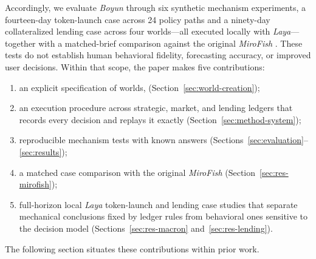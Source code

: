 Accordingly, we evaluate \textit{Boyun} through six synthetic mechanism
experiments, a fourteen-day  token-launch case across
24 policy paths and a ninety-day  collateralized lending
case across four worlds---all executed locally with \textit{Laya}---together
with a matched-brief comparison against the original \textit{MiroFish} . These tests do not establish human
behavioral fidelity, forecasting accuracy, or improved user decisions. Within
that scope, the paper makes five contributions:
\begin{enumerate}\setlength{\itemsep}{1pt}
\item an explicit specification of worlds, 
(Section~\ref{sec:world-creation});
\item an execution procedure across strategic, market, and lending ledgers that
records every  decision and replays it exactly
(Section~\ref{sec:method-system});
\item reproducible mechanism tests with known answers
(Sections~\ref{sec:evaluation}--\ref{sec:results});
\item a matched case comparison with the original \textit{MiroFish}
(Section~\ref{sec:res-mirofish});
\item full-horizon local \textit{Laya} token-launch and lending case studies
that
separate mechanical conclusions fixed by ledger rules from behavioral ones
sensitive to the  decision model (Sections~\ref{sec:res-macron}
and~\ref{sec:res-lending}).
\end{enumerate}
The following section situates these contributions within prior work.
